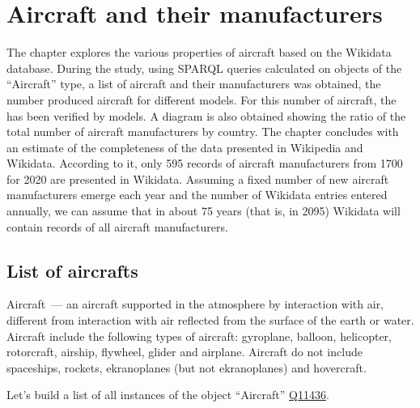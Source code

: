 \setchapterpreamble[u]{\margintoc}
\chapter[Aircraft and their manufacturers]{Aircraft and their manufacturers\protect\footnotemark}


The chapter explores the various properties of aircraft based on the Wikidata database.
During the study, using SPARQL queries calculated on objects of the ``Aircraft'' type, a list of aircraft and their manufacturers was obtained, the number 
produced aircraft for different models. For this number of aircraft, the  has been verified by models.
A diagram is also obtained showing the ratio of the total number of aircraft manufacturers by country.
The chapter concludes with an estimate of the completeness of the data presented in Wikipedia and Wikidata. 
According to it, only 595 records of aircraft manufacturers from \num{1700} for 2020 are presented in Wikidata.
Assuming a fixed number of new aircraft manufacturers emerge each year and the number of Wikidata entries entered annually, 
we can assume that in about 75 years (that is, in 2095) Wikidata will contain records of all aircraft manufacturers.



\section{List of aircrafts}

Aircraft~--- an aircraft supported in the atmosphere by interaction with air, different from interaction with air reflected from the 
surface of the earth or water.
Aircraft include the following types of aircraft: gyroplane, balloon, helicopter, rotorcraft, airship, flywheel, glider and airplane.
Aircraft do not include spaceships, rockets, ekranoplanes (but not ekranoplanes) and hovercraft.

Let's build a list of all instances of the object ``Aircraft'' \href{https://www.wikidata.org/wiki/Q11436}{Q11436}.

